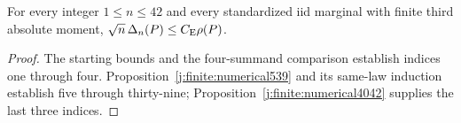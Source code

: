 \begin{theorem}\label{j:finite:base}
For every integer $1\le n\le42$ and every standardized iid marginal
with finite third absolute moment, $\sqrt n\,\Delta_n(P)\le C_{\mathrm E}\rho(P)$.
\end{theorem}
\begin{proof}
The starting bounds and the four-summand comparison establish indices
one through four. Proposition~\ref{j:finite:numerical539} and its
same-law induction establish five through thirty-nine;
Proposition~\ref{j:finite:numerical4042} supplies the last three indices.
\end{proof}
